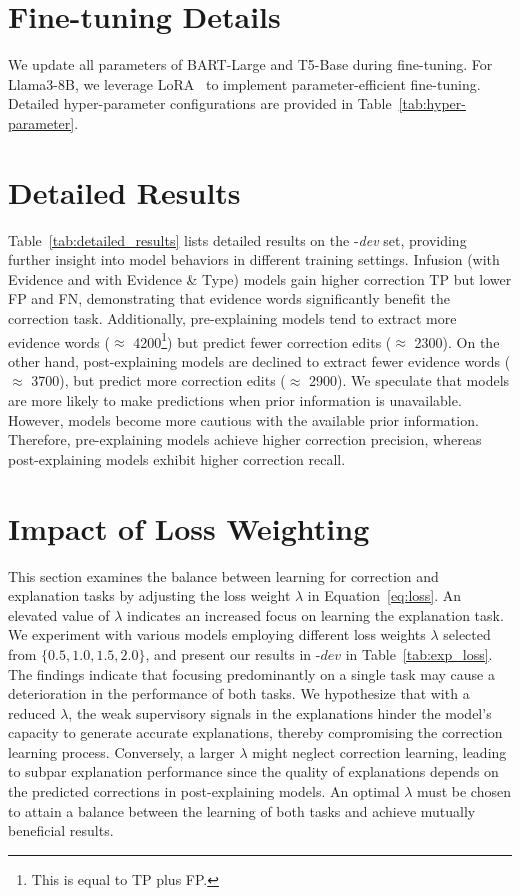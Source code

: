 



\section{Fine-tuning Details}
\label{app:training_details}
We update all parameters of BART-Large and T5-Base during fine-tuning. For Llama3-8B, we leverage LoRA~\citep{hu2022lora} to implement parameter-efficient fine-tuning. Detailed hyper-parameter configurations are provided in Table~\ref{tab:hyper-parameter}. 

\section{Detailed Results}
\label{app:detailed_results}
Table~\ref{tab:detailed_results} lists detailed results on the \Dataset{}-\textit{dev} set, providing further insight into model behaviors in different training settings. Infusion (with Evidence and with Evidence \& Type) models gain higher correction TP but lower FP and FN, demonstrating that evidence words significantly benefit the correction task. Additionally, pre-explaining models tend to extract more evidence words ($\approx$ 4200\footnote{This is equal to TP plus FP.}) but predict fewer correction edits ($\approx$ 2300).
On the other hand, post-explaining models are declined to extract fewer evidence words ($\approx$ 3700), but predict more correction edits ($\approx$ 2900). We speculate that models are more likely to make predictions when prior information is unavailable. However, models become more cautious with the available prior information. Therefore, pre-explaining models achieve higher correction precision, whereas post-explaining models exhibit higher correction recall.

\section{Impact of Loss Weighting}
\label{app:loss_weight}
This section examines the balance between learning for correction and explanation tasks by adjusting the loss weight $\lambda$ in Equation~\eqref{eq:loss}. An elevated value of $\lambda$ indicates an increased focus on learning the explanation task. We experiment with various models employing different loss weights $\lambda$ selected from $\{0.5, 1.0, 1.5, 2.0\}$, and present our results in \Dataset{}-$\textit{dev}$ in Table~\ref{tab:exp_loss}. The findings indicate that focusing predominantly on a single task may cause a deterioration in the performance of both tasks. We hypothesize that with a reduced $\lambda$, the weak supervisory signals in the explanations hinder the model's capacity to generate accurate explanations, thereby compromising the correction learning process. Conversely, a larger $\lambda$ might neglect correction learning, leading to subpar explanation performance since the quality of explanations depends on the predicted corrections in post-explaining models. An optimal $\lambda$ must be chosen to attain a balance between the learning of both tasks and achieve mutually beneficial results.
